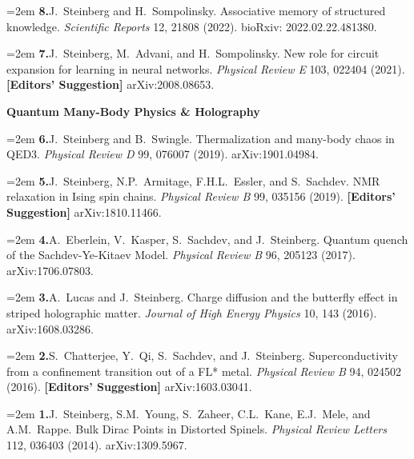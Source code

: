 \documentclass[11pt, letterpaper]{article}
\newcommand{\pub}[2]{%
  \noindent\hangindent=2em\hangafter=1
  \textbf{#1.}\enspace #2\par\vspace{3pt}%
}
\begin{document}
\pub{8}{J.\ Steinberg and H.\ Sompolinsky. Associative memory of structured knowledge.
  \textit{Scientific Reports} 12, 21808 (2022). bioRxiv: 2022.02.22.481380.}

\pub{7}{J.\ Steinberg, M.\ Advani, and H.\ Sompolinsky. New role for circuit expansion
  for learning in neural networks. \textit{Physical Review E} 103, 022404 (2021).
  \textbf{[Editors' Suggestion]} arXiv:2008.08653.}

\vspace{6pt}
\textbf{\textcolor{accentblue}{Quantum Many-Body Physics \& Holography}}

\vspace{4pt}

\pub{6}{J.\ Steinberg and B.\ Swingle. Thermalization and many-body chaos in QED3.
  \textit{Physical Review D} 99, 076007 (2019). arXiv:1901.04984.}

\pub{5}{J.\ Steinberg, N.P.\ Armitage, F.H.L.\ Essler, and S.\ Sachdev. NMR
  relaxation in Ising spin chains. \textit{Physical Review B} 99, 035156 (2019).
  \textbf{[Editors' Suggestion]} arXiv:1810.11466.}

\pub{4}{A.\ Eberlein, V.\ Kasper, S.\ Sachdev, and J.\ Steinberg. Quantum quench of
  the Sachdev-Ye-Kitaev Model. \textit{Physical Review B} 96, 205123 (2017).
  arXiv:1706.07803.}

\pub{3}{A.\ Lucas and J.\ Steinberg. Charge diffusion and the butterfly effect in
  striped holographic matter. \textit{Journal of High Energy Physics} 10, 143 (2016).
  arXiv:1608.03286.}

\pub{2}{S.\ Chatterjee, Y.\ Qi, S.\ Sachdev, and J.\ Steinberg. Superconductivity
  from a confinement transition out of a FL* metal. \textit{Physical Review B} 94,
  024502 (2016). \textbf{[Editors' Suggestion]} arXiv:1603.03041.}

\pub{1}{J.\ Steinberg, S.M.\ Young, S.\ Zaheer, C.L.\ Kane, E.J.\ Mele, and
  A.M.\ Rappe. Bulk Dirac Points in Distorted Spinels. \textit{Physical Review
  Letters} 112, 036403 (2014). arXiv:1309.5967.}

\end{document}

